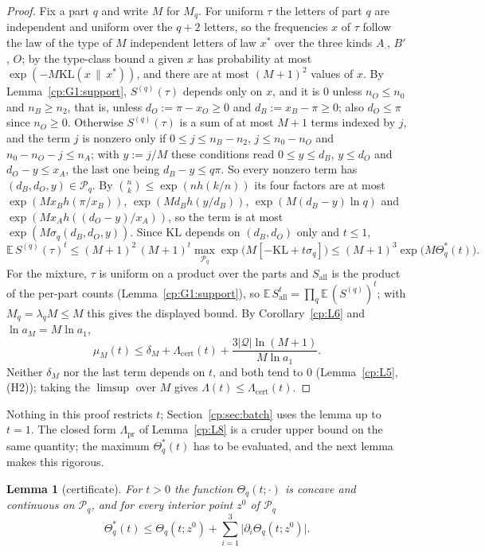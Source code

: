 \documentclass[11pt]{article}
\newtheorem{lemma}[theorem]{Lemma}
\theoremstyle{definition}
\theoremstyle{remark}
\newcommand{\abs}[1]{\lvert #1\rvert}
\newcommand{\Hb}{h}                           %
\newcommand{\Lam}{\Lambda}                    %
\newcommand{\Lampr}{\Lambda_{\mathrm{pr}}}    %
\newcommand{\Lamcert}{\Lambda_{\mathrm{cert}}}%
\newcommand{\Hcond}[1]{\textup{(H#1)}}        %
\newcommand{\Qs}{\mathcal{Q}}                 %
\newcommand{\Sall}{S_{\mathrm{all}}}          %
\newcommand{\Bp}{B'}                          %
\newcommand{\Oterm}{O}                        %
\newcommand{\KL}{\mathrm{KL}}                        %
\newcommand{\Polq}{\mathcal P}                       %
\begin{document}
\begin{proof}
Fix a part $q$ and write $M$ for $M_q$. For uniform $\tau$ the letters of part $q$ are independent and uniform over the $q+2$ letters, so the frequencies $x$ of $\tau$ follow the law of the type of $M$ independent letters of law $x^*$ over the three kinds $A_\cdot$, $\Bp$, $\Oterm$; by the type-class bound a given $x$ has probability at most $\exp(-M\KL(x\,\|\,x^*))$, and there are at most $(M+1)^2$ values of $x$. By Lemma~\ref{cp:G1:support}, $S^{(q)}(\tau)$ depends only on $x$, and it is $0$ unless $n_O\le n_0$ and $n_B\ge n_2$, that is, unless $d_O:=\pi-x_O\ge0$ and $d_B:=x_B-\pi\ge0$; also $d_O\le\pi$ since $n_O\ge0$. Otherwise $S^{(q)}(\tau)$ is a sum of at most $M+1$ terms indexed by $j$, and the term $j$ is nonzero only if $0\le j\le n_B-n_2$, $j\le n_0-n_O$ and $n_0-n_O-j\le n_A$; with $y:=j/M$ these conditions read $0\le y\le d_B$, $y\le d_O$ and $d_O-y\le x_A$, the last one being $d_B-y\le q\pi$. So every nonzero term has $(d_B,d_O,y)\in\Polq_q$. By $\binom nk\le\exp(n\Hb(k/n))$ its four factors are at most $\exp(Mx_B\Hb(\pi/x_B))$, $\exp(Md_B\Hb(y/d_B))$, $\exp(M(d_B-y)\ln q)$ and $\exp(Mx_A\Hb((d_O-y)/x_A))$, so the term is at most $\exp(M\sigma_q(d_B,d_O,y))$. Since $\KL$ depends on $(d_B,d_O)$ only and $t\le1$,
\[
\mathbb E\,S^{(q)}(\tau)^t\le(M+1)^2\,(M+1)^t\max_{\Polq_q}\exp\bigl(M[-\KL+t\sigma_q]\bigr)\le(M+1)^3\exp\bigl(M\Theta^*_q(t)\bigr).
\]
For the mixture, $\tau$ is uniform on a product over the parts and $\Sall$ is the product of the per-part counts (Lemma~\ref{cp:G1:support}), so $\mathbb E\,\Sall^t=\prod_q\mathbb E\,(S^{(q)})^t$; with $M_q=\lambda_qM\le M$ this gives the displayed bound. By Corollary~\ref{cp:L6} and $\ln a_M=M\ln a_1$,
\[
\mu_M(t)\le\delta_M+\Lamcert(t)+\frac{3\abs\Qs\ln(M+1)}{M\ln a_1}.
\]
Neither $\delta_M$ nor the last term depends on $t$, and both tend to $0$ (Lemma~\ref{cp:L5}, \Hcond2); taking the $\limsup$ over $M$ gives $\Lam(t)\le\Lamcert(t)$.
\end{proof}

Nothing in this proof restricts $t$; Section~\ref{cp:sec:batch} uses the lemma up to $t=1$. The closed form $\Lampr$ of Lemma~\ref{cp:L8} is a cruder upper bound on the same quantity; the maximum $\Theta^*_q(t)$ has to be evaluated, and the next lemma makes this rigorous.

\begin{lemma}[certificate]\label{cp:G2}
For $t>0$ the function $\Theta_q(t;\cdot)$ is concave and continuous on $\Polq_q$, and for every interior point $z^0$ of $\Polq_q$
\[
\Theta^*_q(t)\le\Theta_q(t;z^0)+\sum_{i=1}^3\abs{\partial_i\Theta_q(t;z^0)}.
\]
\end{lemma}
\end{document}
